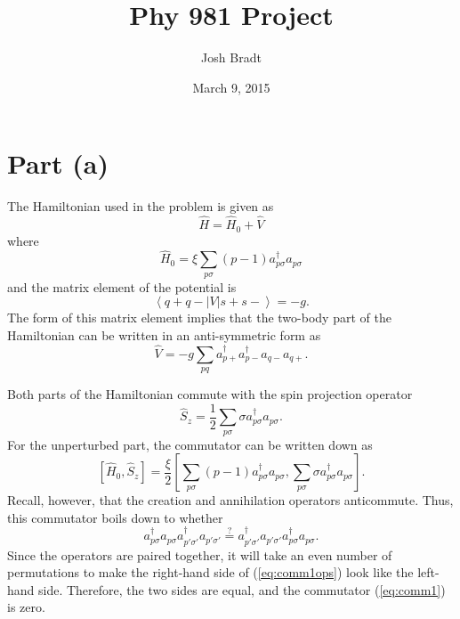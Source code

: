 \documentclass{article}
\title{Phy 981 Project}
\author{Josh Bradt}
\date{March 9, 2015}
\newcommand{\mel}[3]{\ensuremath{\left<#1 \right|\! #2 \!\left| #3 \right>}}
\begin{document}
\maketitle

\section*{Part (a)}
	
	The Hamiltonian used in the problem is given as
	\begin{equation*}
		\hat H = \hat H_0 + \hat V
	\end{equation*}
	where
	\begin{equation}
		\hat H_0 = \xi \sum_{p\sigma} (p-1) a_{p\sigma}^\dagger a_{p\sigma}
	\end{equation}
	and the matrix element of the potential is
	\begin{equation}
		\mel{q+q-}{V}{s+s-} = -g.  \label{eq:potelmnt}
	\end{equation}
	The form of this matrix element implies that the two-body part of the Hamiltonian can be written in an anti-symmetric form as
	\begin{equation}
		\hat V = -g \sum_{pq} a^\dagger_{p+} a^\dagger_{p-} a_{q-} a_{q+}.
	\end{equation}

	Both parts of the Hamiltonian commute with the spin projection operator
	\begin{equation*}
		\hat S_z = \frac{1}{2} \sum_{p\sigma} \sigma a^\dagger_{p\sigma} a_{p\sigma}.
	\end{equation*}
	For the unperturbed part, the commutator can be written down as
	\begin{equation}
		\left[\hat H_0, \hat S_z \right] = \frac{\xi}{2} \left[ \sum_{p\sigma} (p-1) a_{p\sigma}^\dagger a_{p\sigma}, \sum_{p\sigma} \sigma a^\dagger_{p\sigma} a_{p\sigma} \right]. \label{eq:comm1}
	\end{equation}
	Recall, however, that the creation and annihilation operators anticommute. Thus, this commutator boils down to whether
	\begin{equation}
		a^\dagger_{p\sigma} a_{p\sigma} a^\dagger_{p'\sigma'} a_{p'\sigma'} \stackrel{?}{=} a^\dagger_{p'\sigma'} a_{p'\sigma'} a^\dagger_{p\sigma} a_{p\sigma}. \label{eq:comm1ops}
	\end{equation}
	Since the operators are paired together, it will take an even number of permutations to make the right-hand side of (\ref{eq:comm1ops}) look like the left-hand side. Therefore, the two sides are equal, and the commutator (\ref{eq:comm1}) is zero.
\end{document}
